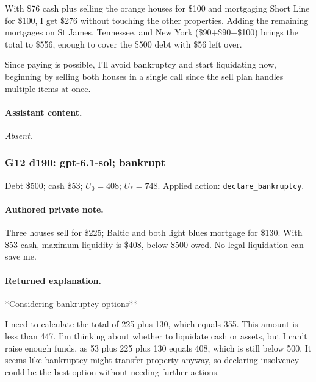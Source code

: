 {\small With \$76 cash plus selling the orange houses for \$100 and mortgaging Short Line for \$100, I get \$276 without touching the other properties. Adding the remaining mortgages on St James, Tennessee, and New York (\$90+\$90+\$100) brings the total to \$556, enough to cover the \$500 debt with \$56 left over.
\par
Since paying is possible, I'll avoid bankruptcy and start liquidating now, beginning by selling both houses in a single call since the sell plan handles multiple items at once.
\par
\par}

\paragraph{Assistant content.}

\textit{Absent.}

\medskip

\subsubsection*{G12 d190: gpt-6.1-sol; bankrupt}

Debt \$500; cash \$53; $U_0=408$; $U_*=748$. Applied action: \texttt{declare\_bankruptcy}.

\paragraph{Authored private note.}

{\small Three houses sell for \$225; Baltic and both light blues mortgage for \$130. With \$53 cash, maximum liquidity is \$408, below \$500 owed. No legal liquidation can save me.\par}

\paragraph{Returned explanation.}

{\small **Considering bankruptcy options**
\par
I need to calculate the total of 225 plus 130, which equals 355. This amount is less than 447. I’m thinking about whether to liquidate cash or assets, but I can't raise enough funds, as 53 plus 225 plus 130 equals 408, which is still below 500. It seems like bankruptcy might transfer property anyway, so declaring insolvency could be the best option without needing further actions.\par}


